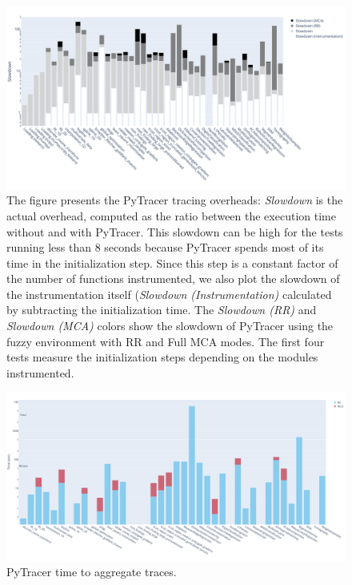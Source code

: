 \documentclass[11pt]{article}
\newcommand{\pytracer}[0]{PyTracer\xspace}
\begin{document}
\begin{figure}
    \centering
    \includegraphics[width=\linewidth]{figure/performance.pdf}
    \caption{
    The figure presents the \pytracer tracing overheads: \textit{Slowdown} is the actual overhead, computed as the ratio between the execution time without and with \pytracer. This slowdown can be high for the tests running less than 8 seconds because \pytracer spends most of its time in the initialization step. Since this step is a constant factor of the number of functions instrumented, we also plot the slowdown of the instrumentation itself (\textit{Slowdown (Instrumentation)} calculated by subtracting the initialization time.
    The \textit{Slowdown (RR)} and \textit{Slowdown (MCA)} colors show the slowdown of \pytracer 
    using the fuzzy environment with RR and Full MCA modes.
    The first four tests measure the initialization steps depending on the modules instrumented.
    }
    \label{fig:performances}
\end{figure}

\begin{figure}
    \centering
    \includegraphics[width=\linewidth]{figure/parsing_time.pdf}
    \caption{\pytracer time to aggregate traces.}
    \label{fig:performance_parsing_time}
\end{figure}
\end{document}
